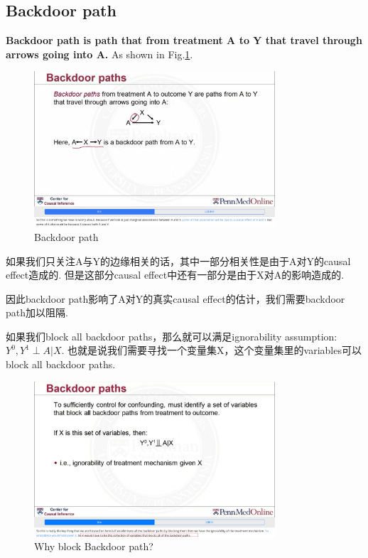 \subsection{Backdoor path}
{\bfseries Backdoor path is path that from treatment A to Y that travel through arrows {\color{orange}going into} A.}  As shown in Fig.\ref{backdoor}.
	\begin{figure}[htbp]
	\setlength{\abovecaptionskip}{0pt}     %
	\setlength{\belowcaptionskip}{10pt}
	\vspace{-0cm}  %
	\setlength{\abovecaptionskip}{-0cm}   %
	\setlength{\belowcaptionskip}{-0cm}   %
	\centering
	\includegraphics[width=0.8\textwidth]{figure/backdoor.jpg}
	\caption{Backdoor path}
	\label{backdoor}
\end{figure}
如果我们只关注A与Y的边缘相关的话，其中一部分相关性是由于A对Y的causal effect造成的. 但是这部分causal effect中还有一部分是由于X对A的影响造成的. 

因此backdoor path影响了A对Y的真实causal effect的估计，我们需要backdoor path加以阻隔. 

如果我们block all backdoor paths，那么就可以满足ignorability assumption: $Y^0,Y^1 \perp A|X$. 也就是说我们需要寻找一个变量集X，这个变量集里的variables可以block all backdoor paths.
	\begin{figure}[htbp]
	\setlength{\abovecaptionskip}{0pt}     %
	\setlength{\belowcaptionskip}{10pt}
	\vspace{-0cm}  %
	\setlength{\abovecaptionskip}{-0cm}   %
	\setlength{\belowcaptionskip}{-0cm}   %
	\centering
	\includegraphics[width=0.8\textwidth]{figure/whyblockbackdoor.png}
	\caption{Why block Backdoor path?}
	\label{whyblockbackdoor}
    \end{figure}


